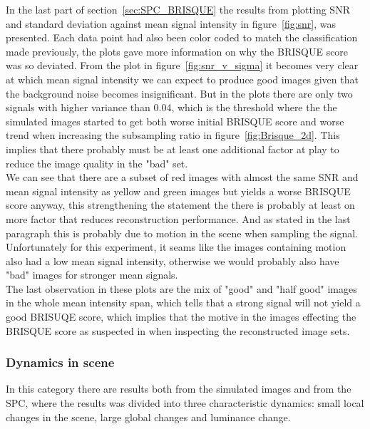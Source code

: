 In the last part of section~\ref{sec:SPC_BRISQUE} the results from plotting SNR and standard deviation against mean signal intensity in figure~\ref{fig:snr}, was presented. Each data point had also been color coded to match the classification made previously, the plots gave more information on why the BRISQUE score was so deviated. From the plot in figure~\ref{fig:snr_v_sigma} it becomes very clear at which mean signal intensity we can expect to produce good images given that the background noise becomes insignificant. But in the plots there are only two signals with higher variance than 0.04, which is the threshold where the the simulated images started to get both worse initial BRISQUE score and worse trend when increasing the subsampling ratio in figure~\ref{fig:Brisque_2d}. This implies that there probably must be at least one additional factor at play to reduce the image quality in the "bad" set.\\[0.1in]


We can see that there are a subset of red images with almost the same SNR and mean signal intensity as yellow and green images but yields a worse BRISQUE score anyway, this strengthening the statement the there is probably at least on more factor that reduces reconstruction performance. And as stated in the last paragraph this is probably due to motion in the scene when sampling the signal. Unfortunately for this experiment, it seams like the images containing motion also had a low mean signal intensity, otherwise we would probably also have "bad" images for stronger mean signals.\\[0.1in] 

The last observation in these plots are the mix of "good" and "half good" images in the whole mean intensity span, which tells that a strong signal will not yield a good BRISUQE score, which implies that the motive in the images effecting the BRISQUE score as suspected in when inspecting the reconstructed image sets.

\subsubsection{Dynamics in scene}
In this category there are results both from the simulated images and from the SPC, where the results was divided into three characteristic dynamics: small local changes in the scene, large global changes and luminance change.\\[0.1in]

